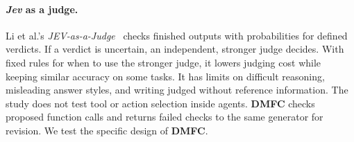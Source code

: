 \paragraph{\textit{Jev} as a judge.}
Li et al.'s \emph{JEV-as-a-Judge}~\cite{li2026jevjudge} checks finished outputs with probabilities for defined verdicts. If a verdict is uncertain, an independent, stronger judge decides. With fixed rules for when to use the stronger judge, it lowers judging cost while keeping similar accuracy on some tasks. It has limits on difficult reasoning, misleading answer styles, and writing judged without reference information. The study does not test tool or action selection inside agents. \textbf{DMFC} checks proposed function calls and returns failed checks to the same generator for revision. We test the specific design of \textbf{DMFC}.
